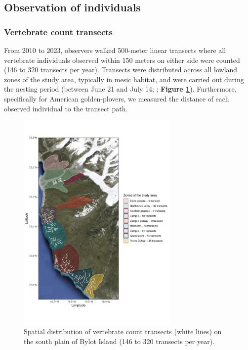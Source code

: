 \documentclass[a4paper,twoside,10pt]{article}
\begin{document}
\subsection{Observation of individuals}
\subsubsection{Vertebrate count transects}
From 2010 to 2023, observers walked 500-meter linear transects where all vertebrate individuals observed within 150 meters on either side were counted (146 to 320 transects per year). Transects were distributed across all lowland zones of the study area, typically in mesic habitat, and were carried out during the nesting period (between June 21 and July 14; \citet{duchesne2021}; \textbf{Figure \ref{figure:transects}}). Furthermore, specifically for American golden-plovers, we measured the distance of each observed individual to the transect path.

\begin{figure}
\centering
  \includegraphics[width=0.7\textwidth, angle=0]{figures/transects.pdf}
  \vspace{-35pt} %
  \caption{Spatial distribution of vertebrate count transects (white lines) on the south plain of Bylot Island (146 to 320 transects per year).}
 \label{figure:transects}
\end{figure}
\end{document}

